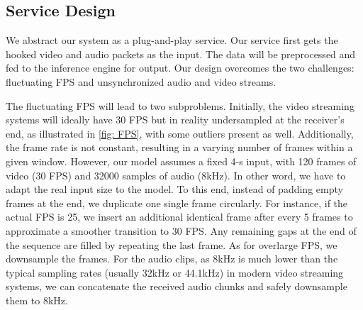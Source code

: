 \subsection{Service Design}
\label{subsec: service}
We abstract our system as a plug-and-play service. 
Our service first gets the hooked video and audio packets as the input. 
The data will be preprocessed and fed to the inference engine for output. 
Our design overcomes the two challenges: fluctuating FPS and unsynchronized audio and video streams. 

 The fluctuating FPS will lead to two subproblems. 
Initially, the video streaming systems will ideally have 30 FPS but in reality undersampled at the receiver's end, as illustrated in \fig\ref{fig: FPS}, with some outliers present as well. 
Additionally, the frame rate is not constant, resulting in a varying number of frames within a given window. However, our model assumes a fixed 4-s input, with 120 frames of video (30 FPS) and 32000 samples of audio (8kHz). In other word, we have to adapt the real input size to the model.
To this end, instead of padding empty frames at the end, we duplicate one single frame circularly. For instance, if the actual FPS is 25, we insert an additional identical frame after every 5 frames to approximate a smoother transition to 30 FPS. Any remaining gaps at the end of the sequence are filled by repeating the last frame. As for overlarge FPS, we downsample the frames.  
For the audio clips, as 8kHz is much lower than the typical sampling rates (usually 32kHz or 44.1kHz) in modern video streaming systems, we can concatenate the received audio chunks and safely downsample them to 8kHz. 


